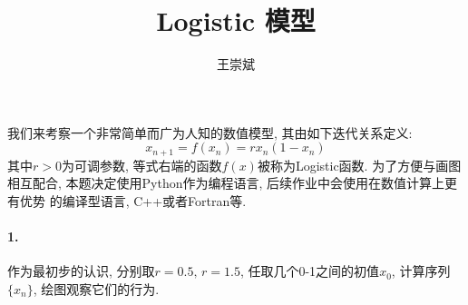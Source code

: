 \documentclass[a4paper,zihao=5,UTF8]{ctexart}
\title{\textbf{Logistic 模型}}
\author{王崇斌\;1800011716}
\begin{document}
	\pagestyle{fancy}
	\pagestyle{fancy}
	\chead{}
	\rhead{\today}
	\maketitle
    \thispagestyle{fancy}
    我们来考察一个非常简单而广为人知的数值模型, 其由如下迭代关系定义: 
    \begin{equation}
        x_{n + 1} = f(x_n) = rx_n (1 - x_n)
    \end{equation}
    其中$r > 0$为可调参数, 等式右端的函数$f(x)$被称为Logistic函数. 为了方便与画图
    相互配合, 本题决定使用Python作为编程语言, 后续作业中会使用在数值计算上更有优势
    的编译型语言, C++或者Fortran等. 
    \paragraph{1.}作为最初步的认识, 分别取$r = 0.5,\,r = 1.5$, 任取几个0-1之间的初值$x_0$, 
    计算序列$\{x_n\}$, 绘图观察它们的行为. 
\end{document}
